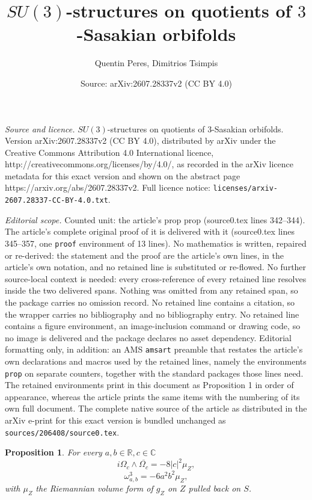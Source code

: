 \documentclass[10pt,a4paper]{amsart}
\title{$SU(3)$-structures on quotients of $3$-Sasakian orbifolds}
\author{Quentin Peres, Dimitrios Tsimpis}
\date{Source: arXiv:2607.28337v2 (CC BY 4.0)}
\newtheorem{prop}{Proposition}
\newcommand{\C}{\mathbb{C}}
\newcommand{\R}{\mathbb{R}}
\begin{document}
\maketitle

\noindent\emph{Source and licence.} $SU(3)$-structures on quotients of $3$-Sasakian orbifolds. Version arXiv:2607.28337v2 (CC BY 4.0), distributed by arXiv under the Creative Commons Attribution 4.0 International licence, http://creativecommons.org/licenses/by/4.0/, as recorded in the arXiv licence metadata for this exact version and shown on the abstract page https://arxiv.org/abs/2607.28337v2. Full licence notice: \texttt{licenses/arxiv-2607.28337-CC-BY-4.0.txt}.\par\smallskip

\noindent\textit{Editorial scope.} Counted unit: the article's prop prop (source0.tex lines 342--344). The article's complete original proof of it is delivered with it (source0.tex lines 345--357, one \texttt{proof} environment of 13 lines). No mathematics is written, repaired or re-derived: the statement and the proof are the article's own lines, in the article's own notation, and no retained line is substituted or re-flowed.  No further source-local context is needed: every cross-reference of every retained line resolves inside the two delivered spans.  Nothing was omitted from any retained span, so the package carries no omission record.  No retained line contains a citation, so the wrapper carries no bibliography and no bibliography entry.  No retained line contains a figure environment, an image-inclusion command or drawing code, so no image is delivered and the package declares no asset dependency.  Editorial formatting only, in addition: an AMS \texttt{amsart} preamble that restates the article's own declarations and macros used by the retained lines, namely the environments \texttt{prop} on separate counters, together with the standard packages those lines need.  The retained environments print in this document as Proposition 1 in order of appearance, whereas the article prints the same items with the numbering of its own full document.  The complete native source of the article as distributed in the arXiv e-print for this exact version is bundled unchanged as \texttt{sources/206408/source0.tex}.
\begin{prop}
    For every $a,b\in\R, c\in\C$ $$i\Omega_c\wedge\overline{\Omega_c}=-8|c|^2\mu_Z,$$ $$\omega_{a,b}^3=-6a^2b^2\mu_Z,$$ with $\mu_Z$ the Riemannian volume form of $g_Z$ on $Z$ pulled back on $S$. 
\end{prop}
\end{document}
